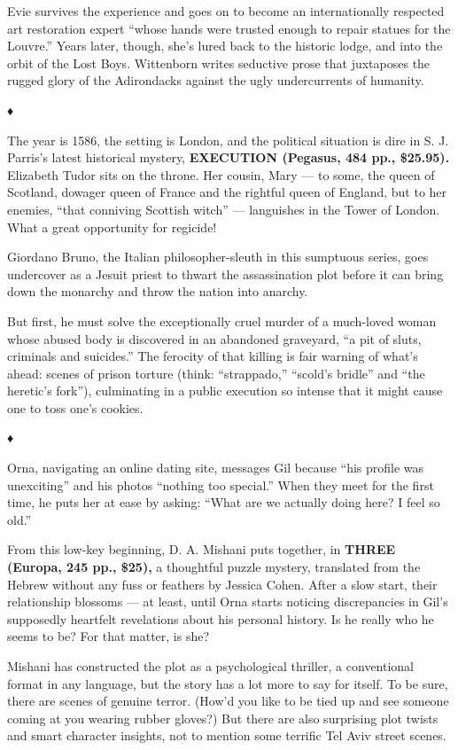 Evie survives the experience and goes on to become an internationally
respected art restoration expert ``whose hands were trusted enough to
repair statues for the Louvre.'' Years later, though, she's lured back
to the historic lodge, and into the orbit of the Lost Boys. Wittenborn
writes seductive prose that juxtaposes the rugged glory of the
Adirondacks against the ugly undercurrents of humanity.

♦

The year is 1586, the setting is London, and the political situation is
dire in S. J. Parris's latest historical mystery, \textbf{EXECUTION
(Pegasus, 484 pp., \$25.95).} Elizabeth Tudor sits on the throne. Her
cousin, Mary --- to some, the queen of Scotland, dowager queen of France
and the rightful queen of England, but to her enemies, ``that conniving
Scottish witch'' --- languishes in the Tower of London. What a great
opportunity for regicide!

Giordano Bruno, the Italian philosopher-sleuth in this sumptuous series,
goes undercover as a Jesuit priest to thwart the assassination plot
before it can bring down the monarchy and throw the nation into anarchy.

But first, he must solve the exceptionally cruel murder of a much-loved
woman whose abused body is discovered in an abandoned graveyard, ``a pit
of sluts, criminals and suicides.'' The ferocity of that killing is fair
warning of what's ahead: scenes of prison torture (think: ``strappado,''
``scold's bridle'' and ``the heretic's fork''), culminating in a public
execution so intense that it might cause one to toss one's cookies.

♦

Orna, navigating an online dating site, messages Gil because ``his
profile was unexciting'' and his photos ``nothing too special.'' When
they meet for the first time, he puts her at ease by asking: ``What are
we actually doing here? I feel so old.''

From this low-key beginning, D. A. Mishani puts together, in
\textbf{THREE (Europa, 245 pp., \$25),} a thoughtful puzzle mystery,
translated from the Hebrew without any fuss or feathers by Jessica
Cohen. After a slow start, their relationship blossoms --- at least,
until Orna starts noticing discrepancies in Gil's supposedly heartfelt
revelations about his personal history. Is he really who he seems to be?
For that matter, is she?

Mishani has constructed the plot as a psychological thriller, a
conventional format in any language, but the story has a lot more to say
for itself. To be sure, there are scenes of genuine terror. (How'd you
like to be tied up and see someone coming at you wearing rubber gloves?)
But there are also surprising plot twists and smart character insights,
not to mention some terrific Tel Aviv street scenes.

